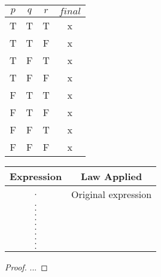 \documentclass[letterpaper]{article}
\begin{document}
\begin{tabular}{|c|c|c|c|} 
 \hline
 $p$ & $q$ & $r$ & $final$\\ 
 \hline
 T & T & T & x\\ 
 T & T & F & x\\
 T & F & T & x\\
 T & F & F & x\\
 F & T & T & x\\
 F & T & F & x\\
 F & F & T & x\\
 F & F & F & x\\
 \hline
\end{tabular}

\begin{tabular}{|c|c|} 
 \hline
 Expression & Law Applied\\ 
 \hline
 $.$ & Original expression\\ 
 $.$ & \\ 
 $.$ & \\ 
 $.$ & \\ 
 $.$ & \\ 
 $.$ & \\ 
 $.$ & \\ 
 $.$ & \\ 
 $.$ & \\ 
 $.$ & \\ 
 $.$ & \\ 
 \hline
\end{tabular}

\begin{proof}
    ...
\end{proof}
\end{document}
